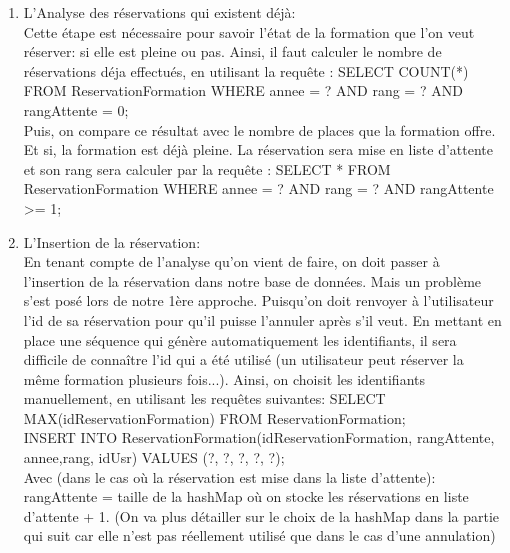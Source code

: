\begin{enumerate}
    \item L’Analyse des réservations qui existent déjà:\\
Cette étape est nécessaire pour savoir l'état de la formation que l'on veut réserver: si elle est pleine ou pas. Ainsi, il faut calculer le nombre de réservations déja effectués, en utilisant la requête : SELECT COUNT(*) FROM ReservationFormation WHERE annee = ? AND rang = ? AND rangAttente = 0;\\
Puis, on compare ce résultat avec le nombre de places que la formation offre. Et si, la formation est déjà pleine. La réservation sera mise en liste d'attente et son rang sera calculer par la requête : SELECT * FROM ReservationFormation WHERE annee = ? AND rang = ? AND rangAttente >= 1;\\

    \item L’Insertion de la réservation:\\
En tenant compte de l'analyse qu'on vient de faire, on doit passer à l'insertion de la réservation dans notre base de données. Mais un problème s'est posé lors de notre 1ère approche. Puisqu'on doit renvoyer à l'utilisateur l'id de sa réservation pour qu'il puisse l'annuler après s'il veut. En mettant en place une séquence qui génère automatiquement les identifiants, il sera difficile de connaître l'id qui a été utilisé (un utilisateur peut réserver la même formation plusieurs fois...). Ainsi, on choisit les identifiants manuellement, en utilisant les requêtes suivantes: SELECT MAX(idReservationFormation) FROM ReservationFormation;\\
INSERT INTO ReservationFormation(idReservationFormation, rangAttente, annee,rang, idUsr) VALUES (?, ?, ?, ?, ?);\\
Avec (dans le cas où la réservation est mise dans la liste d'attente): rangAttente = taille de la hashMap où on stocke les réservations en liste d'attente + 1. (On  va plus détailler sur le choix de la hashMap dans la partie qui suit car elle n'est pas réellement utilisé que dans le cas d'une annulation)


\end{enumerate}
